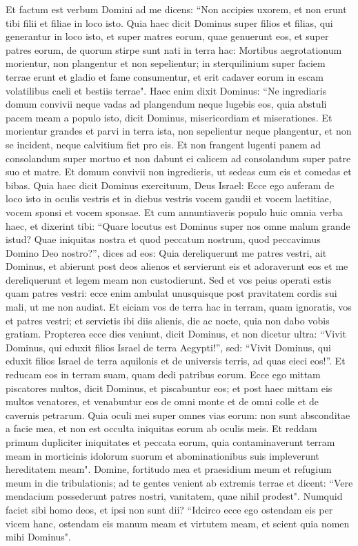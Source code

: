 \begin{biblechapter}  
\verse Et factum est verbum Domini ad me dicens: 
\verse “Non accipies uxorem, et non erunt tibi filii et filiae in loco isto. 
\verse Quia haec dicit Dominus super filios et filias, qui generantur in loco isto, et super matres eorum, quae genuerunt eos, et super patres eorum, de quorum stirpe sunt nati in terra hac:  
\verse Mortibus aegrotationum morientur, non plangentur et non sepelientur; in sterquilinium super faciem terrae erunt et gladio et fame consumentur, et erit cadaver eorum in escam volatilibus caeli et bestiis terrae". 
\verse Haec enim dixit Dominus: “Ne ingrediaris domum convivii neque vadas ad plangendum neque lugebis eos, quia abstuli pacem meam a populo isto, dicit Dominus, misericordiam et miserationes. 
\verse Et morientur grandes et parvi in terra ista, non sepelientur neque plangentur, et non se incident, neque calvitium fiet pro eis.  
\verse Et non frangent lugenti panem ad consolandum super mortuo et non dabunt ei calicem ad consolandum super patre suo et matre. 
\verse Et domum convivii non ingredieris, ut sedeas cum eis et comedas et bibas. 
\verse Quia haec dicit Dominus exercituum, Deus Israel: Ecce ego auferam de loco isto in oculis vestris et in diebus vestris vocem gaudii et vocem laetitiae, vocem sponsi et vocem sponsae. 
\verse Et cum annuntiaveris populo huic omnia verba haec, et dixerint tibi: “Quare locutus est Dominus super nos omne malum grande istud? Quae iniquitas nostra et quod peccatum nostrum, quod peccavimus Domino Deo nostro?”, 
\verse dices ad eos: Quia dereliquerunt me patres vestri, ait Dominus, et abierunt post deos alienos et servierunt eis et adoraverunt eos et me dereliquerunt et legem meam non custodierunt. 
\verse Sed et vos peius operati estis quam patres vestri: ecce enim ambulat unusquisque post pravitatem cordis sui mali, ut me non audiat.  
\verse Et eiciam vos de terra hac in terram, quam ignoratis, vos et patres vestri; et servietis ibi diis alienis, die ac nocte, quia non dabo vobis gratiam. 
\verse Propterea ecce dies veniunt, dicit Dominus, et non dicetur ultra: “Vivit Dominus, qui eduxit filios Israel de terra Aegypti!”, 
\verse sed: “Vivit Dominus, qui eduxit filios Israel de terra aquilonis et de universis terris, ad quas eieci eos!”. Et reducam eos in terram suam, quam dedi patribus eorum. 
\verse Ecce ego mittam piscatores multos, dicit Dominus, et piscabuntur eos; et post haec mittam eis multos venatores, et venabuntur eos de omni monte et de omni colle et de cavernis petrarum. 
\verse Quia oculi mei super omnes vias eorum: non sunt absconditae a facie mea, et non est occulta iniquitas eorum ab oculis meis. 
\verse Et reddam primum dupliciter iniquitates et peccata eorum, quia contaminaverunt terram meam in morticinis idolorum suorum et abominationibus suis impleverunt hereditatem meam". 
\verse Domine, fortitudo mea et praesidium meum et refugium meum in die tribulationis; ad te gentes venient ab extremis terrae et dicent: “Vere mendacium possederunt patres nostri, vanitatem, quae nihil prodest". 
\verse Numquid faciet sibi homo deos, et ipsi non sunt dii? 
\verse “Idcirco ecce ego ostendam eis per vicem hanc, ostendam eis manum meam et virtutem meam, et scient quia nomen mihi Dominus". 
\end{biblechapter}

